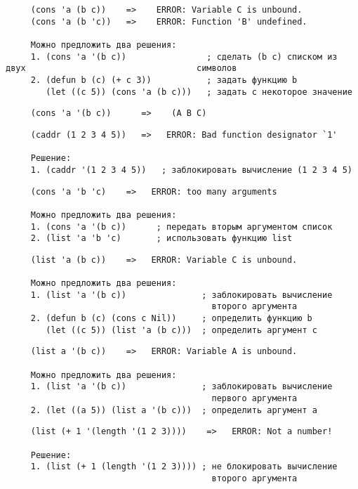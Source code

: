 \begin{lstlisting}
     (cons 'a (b c))    =>    ERROR: Variable C is unbound.
     (cons 'a (b 'c))   =>    ERROR: Function 'B' undefined.

     Можно предложить два решения: 
     1. (cons 'a '(b c))                ; сделать (b c) списком из двух                                  символов
     2. (defun b (c) (+ c 3))           ; задать функцию b  
        (let ((c 5)) (cons 'a (b c)))   ; задать c некоторое значение
\end{lstlisting}

\begin{lstlisting}
     (cons 'a '(b c))      =>    (A B C)
\end{lstlisting}

\begin{lstlisting}
     (caddr (1 2 3 4 5))   =>   ERROR: Bad function designator `1'

     Решение: 
     1. (caddr '(1 2 3 4 5))   ; заблокировать вычисление (1 2 3 4 5)
\end{lstlisting}

\begin{lstlisting}
     (cons 'a 'b 'c)    =>   ERROR: too many arguments

     Можно предложить два решения: 
     1. (cons 'a '(b c))      ; передать вторым аргументом список
     2. (list 'a 'b 'c)       ; использовать функцию list
\end{lstlisting}

\begin{lstlisting}
     (list 'a (b c))    =>   ERROR: Variable C is unbound.

     Можно предложить два решения: 
     1. (list 'a '(b c))               ; заблокировать вычисление 
                                         второго аргумента
     2. (defun b (c) (cons c Nil))     ; определить функцию b
        (let ((c 5)) (list 'a (b c)))  ; определить аргумент c
\end{lstlisting}


\begin{lstlisting}
     (list a '(b c))    =>   ERROR: Variable A is unbound.

     Можно предложить два решения: 
     1. (list 'a '(b c))               ; заблокировать вычисление 
                                         первого аргумента
     2. (let ((a 5)) (list a '(b c)))  ; определить аргумент a
\end{lstlisting}

\begin{lstlisting}
     (list (+ 1 '(length '(1 2 3))))    =>   ERROR: Not a number!

     Решение: 
     1. (list (+ 1 (length '(1 2 3)))) ; не блокировать вычисление 
                                         второго аргумента
\end{lstlisting}




